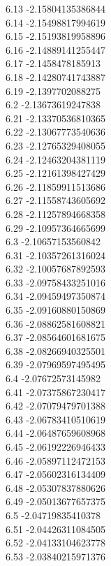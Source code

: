 {6.13	-2.15804135386844\\
6.14	-2.15498817994619\\
6.15	-2.15193819958896\\
6.16	-2.14889141255447\\
6.17	-2.1458478185913\\
6.18	-2.14280741743887\\
6.19	-2.1397702088275\\
6.2	-2.13673619247838\\
6.21	-2.13370536810365\\
6.22	-2.13067773540636\\
6.23	-2.12765329408055\\
6.24	-2.12463204381119\\
6.25	-2.12161398427429\\
6.26	-2.11859911513686\\
6.27	-2.11558743605692\\
6.28	-2.11257894668358\\
6.29	-2.10957364665699\\
6.3	-2.10657153560842\\
6.31	-2.10357261316024\\
6.32	-2.10057687892593\\
6.33	-2.09758433251016\\
6.34	-2.09459497350874\\
6.35	-2.09160880150869\\
6.36	-2.08862581608821\\
6.37	-2.08564601681675\\
6.38	-2.08266940325501\\
6.39	-2.07969597495495\\
6.4	-2.07672573145982\\
6.41	-2.07375867230417\\
6.42	-2.07079479701388\\
6.43	-2.06783410510619\\
6.44	-2.06487659608968\\
6.45	-2.06192226946433\\
6.46	-2.05897112472153\\
6.47	-2.05602316134409\\
6.48	-2.05307837880626\\
6.49	-2.05013677657375\\
6.5	-2.04719835410378\\
6.51	-2.04426311084505\\
6.52	-2.04133104623778\\
6.53	-2.03840215971376\\
}
